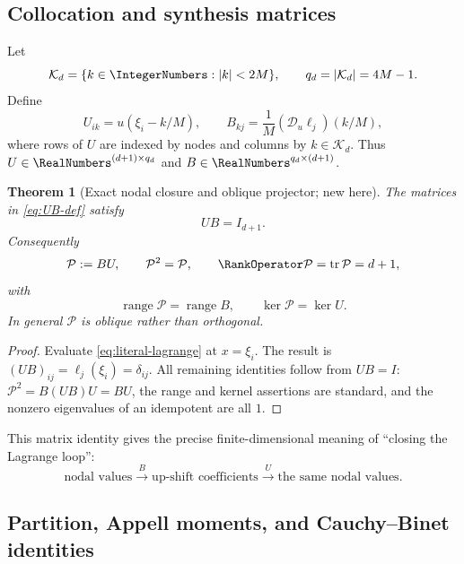 \documentclass[11pt]{article}
\newtheorem{theorem}{Theorem}[section]
\theoremstyle{definition}
\theoremstyle{remark}
\newcommand{\Dscr}{\mathscr D_{u}}
\newcommand{\tr}{\operatorname{tr}}
\begin{document}
\subsection{Collocation and synthesis matrices}

Let
\[
 \mathcal K_d=\{k\in\IntegerNumbers:|k|<2M\},
 \qquad q_d=|\mathcal K_d|=4M-1.
\]
Define
\begin{equation}
 U_{ik}=u(\xi_i-k/M),
 \qquad
 B_{kj}=\frac1M(\Dscr\ell_j)(k/M),
 \label{eq:UB-def}
\end{equation}
where rows of $U$ are indexed by nodes and columns by $k\in\mathcal K_d$.
Thus $U\in\RealNumbers^{(d+1)\times q_d}$ and $B\in\RealNumbers^{q_d\times(d+1)}$.

\begin{theorem}[Exact nodal closure and oblique projector; new here]
\label{thm:UB}
The matrices in \eqref{eq:UB-def} satisfy
\begin{equation}
 \boxed{UB=I_{d+1}.}
 \label{eq:UB}
\end{equation}
Consequently
\begin{equation}
 \mathcal P:=BU,
 \qquad
 \mathcal P^2=\mathcal P,
 \qquad
 \RankOperator\mathcal P=\tr\mathcal P=d+1,
 \label{eq:oblique-projector}
\end{equation}
with
\begin{equation}
 \operatorname{range}\mathcal P=\operatorname{range}B,
 \qquad
 \ker\mathcal P=\ker U.
 \label{eq:projector-subspaces}
\end{equation}
In general $\mathcal P$ is oblique rather than orthogonal.
\end{theorem}

\begin{proof}
Evaluate \eqref{eq:literal-lagrange} at $x=\xi_i$.  The result is
$(UB)_{ij}=\ell_j(\xi_i)=\delta_{ij}$.  All remaining identities follow from
$UB=I$: $\mathcal P^2=B(UB)U=BU$, the range and kernel assertions are standard,
and the nonzero eigenvalues of an idempotent are all $1$.
\end{proof}

This matrix identity gives the precise finite-dimensional meaning of
``closing the Lagrange loop'':
\[
 \boxed{
 \text{nodal values}
 \xrightarrow{\ B\ }
 \text{up-shift coefficients}
 \xrightarrow{\ U\ }
 \text{the same nodal values}.}
\]

\subsection{Partition, Appell moments, and Cauchy--Binet identities}
\end{document}
